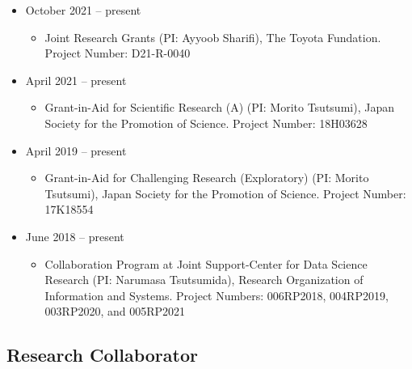 \documentclass[]{book}
\providecommand{\tightlist}{%
  \setlength{\itemsep}{0pt}\setlength{\parskip}{0pt}}
\begin{document}
\begin{itemize}
\tightlist
\item
  October 2021 -- present

  \begin{itemize}
  \tightlist
  \item
    Joint Research Grants (PI: Ayyoob Sharifi),
    The Toyota Fundation.
    Project Number: D21-R-0040
  \end{itemize}
\item
  April 2021 -- present

  \begin{itemize}
  \tightlist
  \item
    Grant-in-Aid for Scientific Research (A) (PI: Morito Tsutsumi),
    Japan Society for the Promotion of Science.
    Project Number: 18H03628
  \end{itemize}
\item
  April 2019 -- present

  \begin{itemize}
  \tightlist
  \item
    Grant-in-Aid for Challenging Research (Exploratory) (PI: Morito Tsutsumi),
    Japan Society for the Promotion of Science.
    Project Number: 17K18554
  \end{itemize}
\item
  June 2018 -- present

  \begin{itemize}
  \tightlist
  \item
    Collaboration Program at Joint Support-Center for Data Science Research (PI: Narumasa Tsutsumida),
    Research Organization of Information and Systems.
    Project Numbers: 006RP2018, 004RP2019, 003RP2020, and 005RP2021
  \end{itemize}
\end{itemize}

\hypertarget{research-collaborator}{%
\subsection*{Research Collaborator}\label{research-collaborator}}
\end{document}
